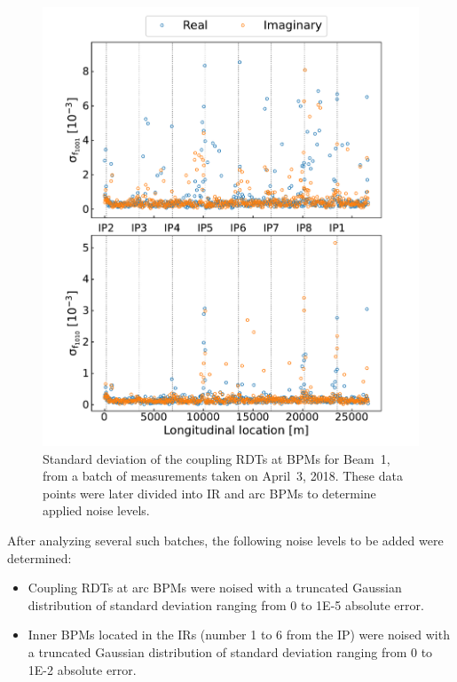 \begin{figure}[!htb]
    \centering
    \includegraphics*[width=\textwidth]{Figures/ML_for_IR_Coupling/ml_rdts_batch_stdev.pdf}
    \caption{Standard deviation of the coupling RDTs at BPMs for Beam~\num{1}, from a batch of measurements taken on April~\num{3}, \num{2018}. These data points were later divided into IR and arc BPMs to determine applied noise levels.}
    \label{figure:rdts_stdev_batch}
\end{figure}

After analyzing several such batches, the following noise levels to be added were determined:
\begin{itemize}
  \item Coupling RDTs at arc BPMs were noised with a truncated Gaussian distribution of standard deviation ranging from \num{0} to \num{1E-5} absolute error.
  \item Inner BPMs located in the IRs (number \num{1} to \num{6} from the IP) were noised with a truncated Gaussian distribution of standard deviation ranging from \num{0} to \num{1E-2} absolute error.
\end{itemize}

